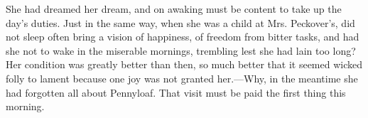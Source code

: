 She had dreamed her dream, and on awaking must be content to take up the
day's duties. Just in the same way, when she was a child at Mrs.
Peckover's, did not sleep often bring a vision of happiness, of freedom
from bitter tasks, and had she not to wake in the
{\protect\hypertarget{155}{}{}}miserable mornings, trembling lest she
had lain too long? Her condition was greatly better than then, so much
better that it seemed wicked folly to lament because one joy was not
granted her.---Why, in the meantime she had forgotten all about
Pennyloaf. That visit must be paid the first thing this morning.
